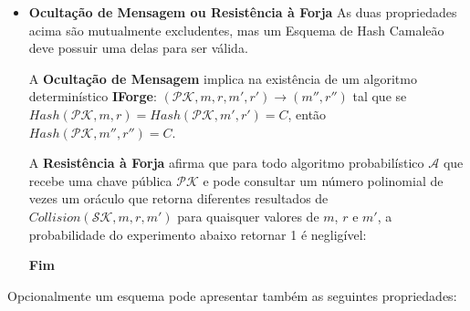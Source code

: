 \documentclass[a4paper]{article}
\begin{document}
\begin{itemize}
\item\textbf{Ocultação de Mensagem ou Resistência à Forja} As duas
  propriedades acima são mutualmente excludentes, mas um Esquema de
  Hash Camaleão deve possuir uma delas para ser válida.

  A \textbf{Ocultação de Mensagem} implica na existência de um
  algoritmo determinístico \textbf{IForge}: $(\mathcal{PK}, m, r, m',
  r') \rightarrow (m'', r'')$ tal que se $Hash(\mathcal{PK}, m, r) =
  Hash(\mathcal{PK}, m', r') = C$, então $Hash(\mathcal{PK}, m'',
  r'')=C$.

  A \textbf{Resistência à Forja} afirma que para todo algoritmo
  probabilístico $\mathcal{A}$ que recebe uma chave pública
  $\mathcal{PK}$ e pode consultar um número polinomial de vezes um
  oráculo que retorna diferentes resultados de
  $Collision(\mathcal{SK}, m, r, m')$ para quaisquer valores de $m$,
  $r$ e $m'$, a probabilidade do experimento abaixo retornar 1 é
  negligível:

  \noindent
  \begin{algorithm}[H]
    \SetAlgoLined
     \textbf{Fim}
  \end{algorithm}
\end{itemize}

Opcionalmente um esquema pode apresentar também as seguintes
propriedades:
\end{document}
